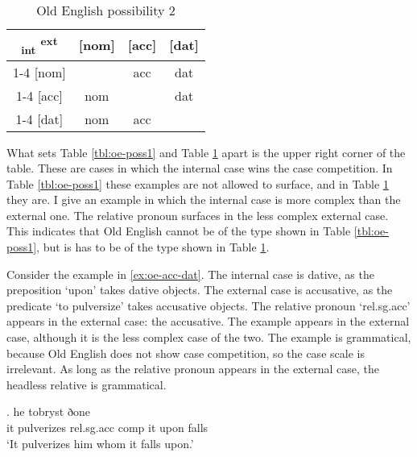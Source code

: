  \begin{table}[H]
   \center
   \caption{Old English possibility 2}
   \begin{tabular}{c|c|c|c}
     \toprule
    \textsubscript{\ac{int}} \textsuperscript{\ac{ext}}
           & [\ac{nom}]
           & [\ac{acc}]
           & [\ac{dat}]
           \\ \cmidrule{1-4}
       [\ac{nom}]
           &
           & \ac{acc}
           & \cellcolor{LG}\ac{dat}
           \\ \cmidrule{1-4}
       [\ac{acc}]
           & \ac{nom}
           &
           & \ac{dat}
           \\ \cmidrule{1-4}
       [\ac{dat}]
           & \ac{nom}
           & \ac{acc}
           &
           \\
     \bottomrule
   \end{tabular}
   \label{tbl:oe-poss2}
 \end{table}

What sets Table \ref{tbl:oe-poss1} and Table \ref{tbl:oe-poss2} apart is the upper right corner of the table. These are cases in which the internal case wins the case competition.
In Table \ref{tbl:oe-poss1} these examples are not allowed to surface, and in Table \ref{tbl:oe-poss2} they are.
I give an example in which the internal case is more complex than the external one. The relative pronoun surfaces in the less complex external case. This indicates that Old English cannot be of the type shown in Table \ref{tbl:oe-poss1}, but is has to be of the type shown in Table \ref{tbl:oe-poss2}.

Consider the example in \ref{ex:oe-acc-dat}.
The internal case is dative, as the preposition  `upon' takes dative objects.
The external case is accusative, as the predicate  `to pulversize' takes accusative objects.
The relative pronoun  `\ac{rel}.\ac{sg}.\ac{acc}' appears in the external case: the accusative.
The example appears in the external case, although it is the less complex case of the two. The example is grammatical, because Old English does not show case competition, so the case scale is irrelevant. As long as the relative pronoun appears in the external case, the headless relative is grammatical.

\exg. he tobryst ðone    \\
 it pulverizes\scsub{[acc]} \ac{rel}.\ac{sg}.\ac{acc} \ac{comp} it upon\scsub{[dat]} falls\\
`It pulverizes him whom it falls upon.'  \label{ex:oe-acc-dat}

